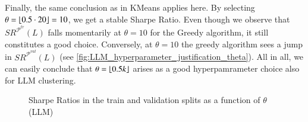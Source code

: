 Finally, the same conclusion as in KMeans applies here. By selecting $\theta=\lfloor 0.5\cdot 20 \rfloor=10$, we get a stable Sharpe Ratio. Even though we observe that $SR^{\mathcal P^{tr}}(L)$ falls momentarily at $\theta=10$ for the Greedy algorithm, it still constitutes a good choice. Conversely, at $\theta=10$ the greedy algorithm sees a jump in $SR^{\mathcal P^{val}}(L)$ (see \cref{fig:LLM_hyperparameter_justification_theta}). All in all, we can easily conclude that $\theta=\lfloor 0.5k \rfloor$ arises as a good hyperpamrameter choice also for LLM clustering.
\begin{figure}[H]
\caption{Sharpe Ratios in the train and validation splits as a function of $\theta$ (LLM)}
  \centering


\end{figure}
